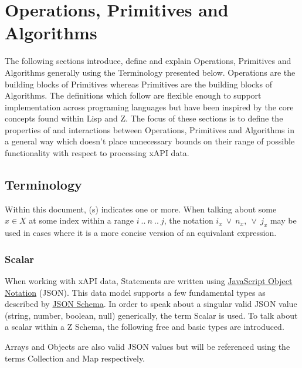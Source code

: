 \documentclass[../main.tex]{subfiles}
\begin{document}
\section{Operations, Primitives and Algorithms}
The following sections introduce, define and explain Operations, Primitives and Algorithms generally using the Terminology presented below. Operations are the building blocks of Primitives whereas Primitives are the building blocks of Algorithms. The definitions which follow are flexible enough to support implementation across programing languages but have been inspired by the core concepts found within Lisp and Z. The focus of these sections is to define the properties of and interactions between Operations, Primitives and Algorithms in a general way which doesn't place unnecessary bounds on their range of possible functionality with respect to processing xAPI data.

\subsection{Terminology}

Within this document, (s) indicates one or more.
When talking about some $x \in X$ at some index within a range $i~..~n~..~j$, the notation $i_{x} ~\lor ~n_{x}, ~\lor ~j_{x}$ may be used in cases where it is a more concise version of an equivalant expression.

\subsubsection{Scalar}
When working with xAPI data, Statements are written using \href{https://www.json.org/}{JavaScript Object Notation} (JSON).
This data model supports a few fundamental types as described by \href{https://json-schema.org/understanding-json-schema/reference/type.html}{JSON Schema}.
In order to speak about a singular valid JSON value (string, number, boolean, null) generically, the term Scalar is used.
To talk about a scalar within a Z Schema, the following free and basic types are introduced.
Arrays and Objects are also valid JSON values but will be referenced using the terms Collection and Map respectively.
\end{document}
